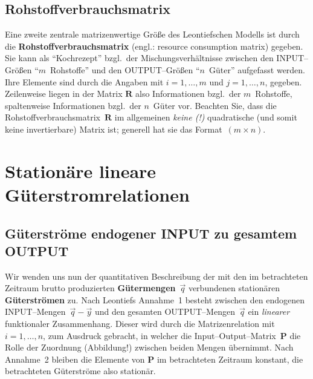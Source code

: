 \subsection{Rohstoffverbrauchsmatrix}
Eine zweite zentrale matrizenwertige Gr\"o\ss e des Leontiefschen
Modells ist durch die {\bf Rohstoffverbrauchsmatrix} (engl.: 
resource consumption matrix) gegeben. Sie
kann als "`Kochrezept"' bzgl.\ der Mischungsverh\"altnisse
zwischen den INPUT--Gr\"o\ss en "`$m$~Rohstoffe"' und den
OUTPUT--Gr\"o\ss en "`$n$~G\"uter"' aufgefasst werden. Ihre
Elemente sind durch die Angaben
%
\be
{}
\ee
%
mit $i=1,\ldots,m$ und $j=1,\ldots,n$, gegeben. Zeilenweise liegen
in der Matrix $\mathbf{R}$ also Informationen bzgl.\ der
$m$~Rohstoffe, spaltenweise Informationen bzgl.\ der $n$~G\"uter
vor. Beachten Sie, dass die Rohstoffverbrauchsmatrix~$\mathbf{R}$
im allgemeinen {\em keine (!)\/} quadratische (und somit keine
invertierbare) Matrix ist; generell hat sie das
Format~$(m \times n)$.

\section[Station\"{a}re lineare G\"uterstromrelationen]%
{Station\"{a}re lineare G\"uterstromrelationen}
\subsection{G\"uterstr\"ome endogener INPUT zu gesamtem OUTPUT}
Wir wenden uns nun der quantitativen Beschreibung der mit den
im betrachteten Zeitraum brutto produzierten
{\bf G\"utermengen}~$\vec{q}$ verbundenen station\"{a}ren {\bf 
G\"uterstr\"omen} zu. Nach Leontiefs Annahme~1 besteht zwischen 
den endogenen INPUT--Mengen~$\vec{q}-\vec{y}$ und den gesamten
OUTPUT--Mengen~$\vec{q}$ ein {\em linearer\/} funktionaler
Zusammenhang. Dieser wird durch die Matrizenrelation
%
\be
{}
\ee
%
mit $i = 1, \ldots, n$, zum Ausdruck gebracht, in welcher die
Input--Output--Matrix~$\mathbf{P}$ die Rolle der Zuordnung
(Abbildung!) zwischen beiden Mengen \"ubernimmt. Nach Annahme~2
bleiben die Elemente von $\mathbf{P}$ im betrachteten
Zeitraum konstant, die betrachteten G\"{u}terstr\"{o}me also 
station\"{a}r.

